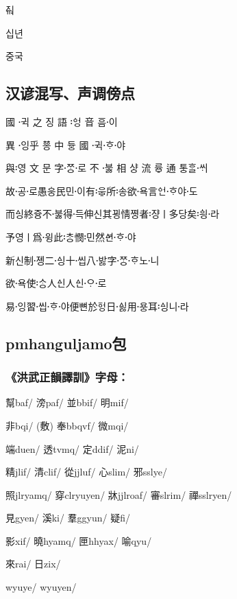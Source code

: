 \documentclass{article}
\begin{document}
ᅎᆑ %

십년 %

중국 %

\newpage

\subsection*{汉谚混写、声调傍点}

\begin{korean}
    {
    \oldjamo
    國 귁〮 之 징 語 ᅌᅥᆼ〯 音 ᅙᅳᆷ이〮
    
    異 잉〮乎 ᅘᅩᆼ 中 듀ᇰ 國 귁〮ᄒᆞ〮야〮
    
    與영〯 文 문 字ᄍᆞᆼ〮로〮 不 부ᇙ〮  相 샤ᇰ 流 류ᇢ 通 토ᇰᄒᆞᆯᄊᆡ〮
    
    故공〮로〮愚ᅌᅮᆼ民민이〮有우ᇢ〯所송〯欲욕〮言ᅌᅥᆫᄒᆞ〮야도〮
    
    而ᅀᅵᆼ終쥬ᇰ不부ᇙ〮得득〮伸신其끵情쪄ᇰ者쟝〯ㅣ多당矣ᅌᅴᆼ〯라〮
    
    予영ㅣ爲윙〮此ᄎᆞᆼ〯憫민〯然ᅀᅧᆫᄒᆞ〮야〮
    
    新신制졩〮二ᅀᅵᆼ〮十씹〮八바ᇙ〮字ᄍᆞᆼ〮ᄒᆞ〮노니〮
    
    欲욕〮使ᄉᆞᆼ〯人ᅀᅵᆫ人ᅀᅵᆫᄋᆞ〮로〮
    
    易잉〮習씹〮ᄒᆞ〮야〮便뼌於ᅙᅥᆼ日ᅀᅵᇙ〮用요ᇰ〮耳ᅀᅵᆼ〯니라〮
    }
\end{korean}

\subsection*{pmhanguljamo包}

\subsubsection*{《洪武正韻譯訓》字母：}

\begin{korean}
  \begin{jamotext}
    幫baf/ 滂paf/ 並bbif/ 明mif/ \par
    非bqi/ (敷)  奉bbqvf/ 微mqi/ \par
    端duen/ 透tvmq/ 定ddif/ 泥ni/ \par
    精jlif/ 清clif/ 從jjluf/ 心slim/ 邪sslye/ \par
    照jlryamq/ 穿clryuyen/ 牀jjlroaf/ 審slrim/ 禪sslryen/ \par
    見gyen/ 溪ki/ 羣ggyun/ 疑fi/ \par
    影xif/ 曉hyamq/ 匣hhyax/ 喻qyu/ \par
    來rai/ 日zix/ \par
    wyuye/ wyuyen/
  \end{jamotext}
\end{korean}
\end{document}
